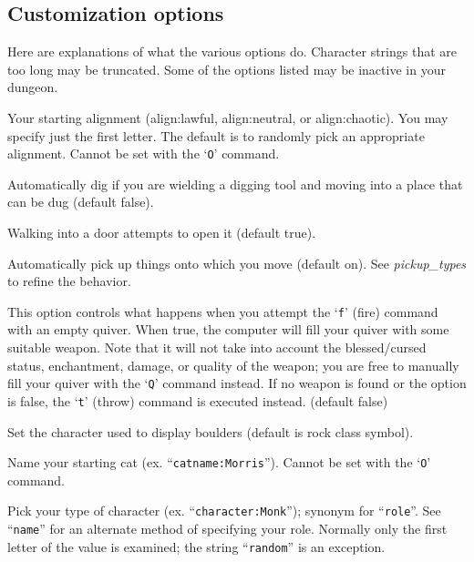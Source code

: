 \subsection*{Customization options}


Here are explanations of what the various options do.
Character strings that are too long may be truncated.
Some of the options listed may be inactive in your dungeon.
\blist{}

\item[\ib{align}]
Your starting alignment (align:lawful, align:neutral,
or align:chaotic).  You may specify just the first letter.
The default is to randomly pick an appropriate alignment.
Cannot be set with the `{\tt O}' command.

\item[\ib{autodig}]
Automatically dig if you are wielding a digging tool and moving into a place
that can be dug (default false).

\item[\ib{autoopen}]
Walking into a door attempts to open it (default true).

\item[\ib{autopickup}]
Automatically pick up things onto which you move (default on). 
See
{\it pickup_types\/} 
to refine the behavior.

\item[\ib{autoquiver}]
This option controls what happens when you attempt the `{\tt f}' (fire)
command with an empty quiver.  When true, the computer will fill
your quiver with some suitable weapon.  Note that it will not take
into account the blessed/cursed status, enchantment, damage, or
quality of the weapon; you are free to manually fill your quiver with
the `{\tt Q}' command instead.  If no weapon is found or the option is
false, the `{\tt t}' (throw) command is executed instead.  (default false)

\item[\ib{boulder}]
Set the character used to display boulders (default is rock class symbol).

\item[\ib{catname}]
Name your starting cat (ex. ``{\tt catname:Morris}'').
Cannot be set with the `{\tt O}' command.

\item[\ib{character}]
Pick your type of character (ex. ``{\tt character:Monk}'');
synonym for ``{\tt role}''.  See ``{\tt name}'' for an alternate method
of specifying your role.  Normally only the first letter of
the value is examined; the string ``{\tt random}'' is an exception.

